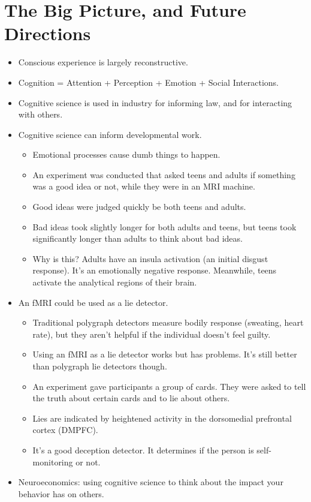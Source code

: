 \documentclass[]{article}
\begin{document}
	\section{The Big Picture, and Future Directions}
		\begin{itemize}
			\item Conscious experience is largely reconstructive.
			\item Cognition = Attention + Perception + Emotion + Social Interactions.
			\item Cognitive science is used in industry for informing law, and for interacting with others.
			\item Cognitive science can inform developmental work.
				\begin{itemize}
					\item Emotional processes cause dumb things to happen.
					\item An experiment was conducted that asked teens and adults if something was a good idea or not, while they were in an MRI machine.
					\item Good ideas were judged quickly be both teens and adults.
					\item Bad ideas took slightly longer for both adults and teens, but teens took significantly longer than adults to think about bad ideas.
					\item Why is this? Adults have an insula activation (an initial disgust response). It's an emotionally negative response. Meanwhile, teens activate the analytical regions of their brain.
				\end{itemize}
				
			\item An fMRI could be used as a lie detector.
				\begin{itemize}
					\item Traditional polygraph detectors measure bodily response (sweating, heart rate), but they aren't helpful if the individual doesn't feel guilty.
					\item Using an fMRI as a lie detector works but has problems. It's still better than polygraph lie detectors though.
					\item An experiment gave participants a group of cards. They were asked to tell the truth about certain cards and to lie about others.
					\item Lies are indicated by heightened activity in the dorsomedial prefrontal cortex (DMPFC).
					\item It's a good deception detector. It determines if the person is self-monitoring or not.
				\end{itemize}
				
			\item Neuroeconomics: using cognitive science to think about the impact your behavior has on others.
		\end{itemize}
\end{document}
